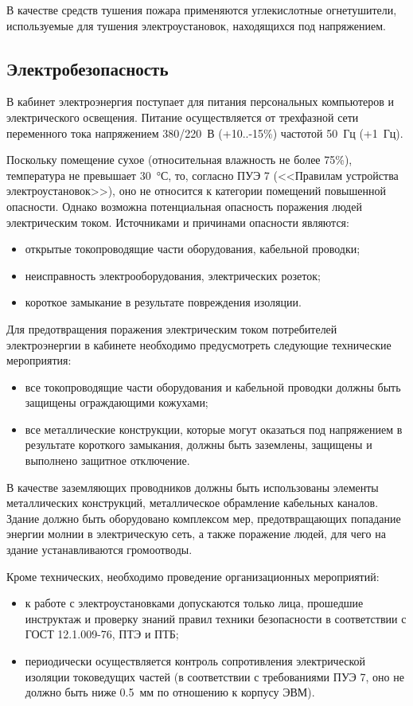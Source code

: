 В качестве средств тушения пожара применяются углекислотные огнетушители, используемые для тушения электроустановок, находящихся под напряжением.

\subsection{Электробезопасность}

В кабинет электроэнергия поступает для питания персональных компьютеров и электрического освещения.
Питание осуществляется от трехфазной сети переменного тока напряжением 380/220~В (+10..-15\%) частотой 50~Гц (+1~Гц).

Поскольку помещение сухое (относительная влажность не более 75\%), температура не превышает 30~°С, то, согласно ПУЭ 7 (<<Правилам устройства электроустановок>>), оно не относится к категории помещений повышенной опасности.
Однако возможна потенциальная опасность поражения людей электрическим током.
Источниками и причинами опасности являются:
\begin{itemize}
  \item открытые токопроводящие части оборудования, кабельной проводки;
  \item неисправность электрооборудования, электрических розеток;
  \item короткое замыкание в результате повреждения изоляции.
\end{itemize}

Для предотвращения поражения электрическим током потребителей электроэнергии в кабинете необходимо предусмотреть следующие технические мероприятия:
\begin{itemize}
  \item все токопроводящие части оборудования и кабельной проводки должны быть защищены ограждающими кожухами;
  \item все металлические конструкции, которые могут оказаться под напряжением в результате короткого замыкания, должны быть заземлены, защищены и выполнено защитное   отключение.
\end{itemize}

В качестве заземляющих проводников должны быть использованы элементы металлических конструкций, металлическое обрамление кабельных каналов.
Здание должно быть оборудовано комплексом мер, предотвращающих попадание энергии молнии в электрическую сеть, а также поражение людей, для чего на здание устанавливаются громоотводы.

Кроме технических, необходимо проведение организационных мероприятий:
\begin{itemize}
  \item к работе с электроустановками допускаются только лица, прошедшие инструктаж и проверку знаний правил техники безопасности в соответствии с ГОСТ 12.1.009-76, ПТЭ и ПТБ;
  \item периодически осуществляется контроль сопротивления электрической изоляции токоведущих частей (в соответствии с требованиями ПУЭ 7, оно не должно быть ниже 0.5~мм по отношению к корпусу ЭВМ).
\end{itemize}

